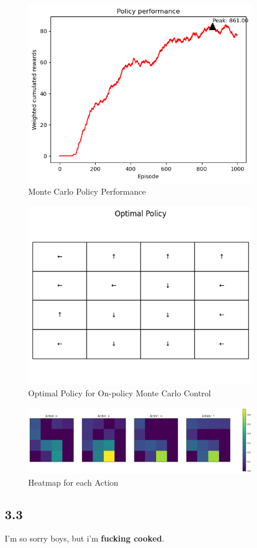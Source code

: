 \documentclass{article} %
\begin{document}
	\begin{figure}[h!]
		\centering
		\includegraphics[width=0.9\textwidth]{images/3.2b.1.png}
		\caption{Monte Carlo Policy Performance}
		\label{fig:10}
	\end{figure}
	
	
	\begin{figure}[h!]
		\centering
		\includegraphics[width=0.9\textwidth]{images/3.2b.2.png}
		\caption{Optimal Policy for On-policy Monte Carlo Control}
		\label{fig:12}
	\end{figure}
	
		\begin{figure}[h!]
		\centering
		\includegraphics[width=0.9\textwidth]{images/3.2b.3.png}
		\caption{Heatmap for each Action}
		\label{fig:13}
	\end{figure}
	
	\subsection{3.3}
	I'm so sorry boys, but i'm \textbf{fucking cooked}. 
	
	
\end{document}
